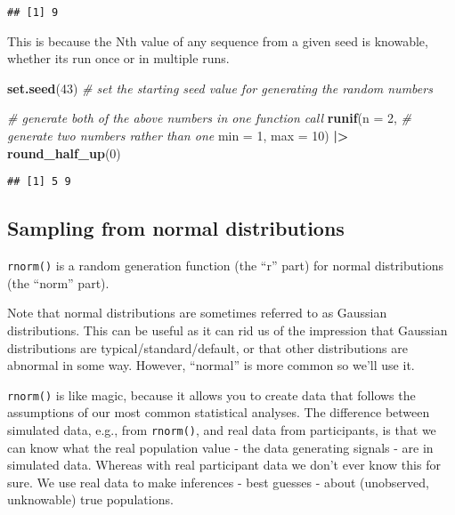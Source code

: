\documentclass[
]{article}
\newenvironment{Shaded}{\begin{snugshade}}{\end{snugshade}}
\newcommand{\AttributeTok}[1]{\textcolor[rgb]{0.13,0.29,0.53}{#1}}
\newcommand{\CommentTok}[1]{\textcolor[rgb]{0.56,0.35,0.01}{\textit{#1}}}
\newcommand{\DecValTok}[1]{\textcolor[rgb]{0.00,0.00,0.81}{#1}}
\newcommand{\FunctionTok}[1]{\textcolor[rgb]{0.13,0.29,0.53}{\textbf{#1}}}
\newcommand{\NormalTok}[1]{#1}
\newcommand{\SpecialCharTok}[1]{\textcolor[rgb]{0.81,0.36,0.00}{\textbf{#1}}}
\begin{document}
\begin{verbatim}
## [1] 9
\end{verbatim}

This is because the Nth value of any sequence from a given seed is
knowable, whether its run once or in multiple runs.

\begin{Shaded}
\begin{Highlighting}[]
\FunctionTok{set.seed}\NormalTok{(}\DecValTok{43}\NormalTok{) }\CommentTok{\# set the starting seed value for generating the random numbers}

\CommentTok{\# generate both of the above numbers in one function call}
\FunctionTok{runif}\NormalTok{(}\AttributeTok{n =} \DecValTok{2}\NormalTok{, }\CommentTok{\# generate two numbers rather than one}
      \AttributeTok{min =} \DecValTok{1}\NormalTok{,}
      \AttributeTok{max =} \DecValTok{10}\NormalTok{) }\SpecialCharTok{|\textgreater{}}
  \FunctionTok{round\_half\_up}\NormalTok{(}\DecValTok{0}\NormalTok{)}
\end{Highlighting}
\end{Shaded}

\begin{verbatim}
## [1] 5 9
\end{verbatim}

\hypertarget{sampling-from-normal-distributions}{%
\subsection{Sampling from normal
distributions}\label{sampling-from-normal-distributions}}

\texttt{rnorm()} is a random generation function (the ``r'' part) for
normal distributions (the ``norm'' part).

Note that normal distributions are sometimes referred to as Gaussian
distributions. This can be useful as it can rid us of the impression
that Gaussian distributions are typical/standard/default, or that other
distributions are abnormal in some way. However, ``normal'' is more
common so we'll use it.

\texttt{rnorm()} is like magic, because it allows you to create data
that follows the assumptions of our most common statistical analyses.
The difference between simulated data, e.g., from \texttt{rnorm()}, and
real data from participants, is that we can know what the real
population value - the data generating signals - are in simulated data.
Whereas with real participant data we don't ever know this for sure. We
use real data to make inferences - best guesses - about (unobserved,
unknowable) true populations.
\end{document}
